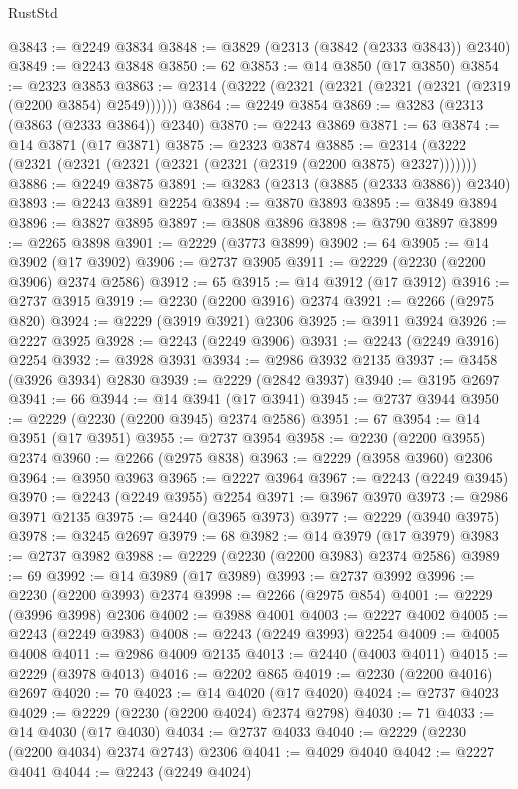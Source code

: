 \begin{lexlean}{RustStd}
\begin{coremodule}
@3843 := @2249 @3834
@3848 := @3829 (@2313 (@3842 (@2333 @3843)) @2340)
@3849 := @2243 @3848
@3850 := 62
@3853 := @14 @3850 (@17 @3850)
@3854 := @2323 @3853
@3863 := @2314 (@3222 (@2321 (@2321 (@2321 (@2321 (@2319 (@2200 @3854) @2549))))))
@3864 := @2249 @3854
@3869 := @3283 (@2313 (@3863 (@2333 @3864)) @2340)
@3870 := @2243 @3869
@3871 := 63
@3874 := @14 @3871 (@17 @3871)
@3875 := @2323 @3874
@3885 := @2314 (@3222 (@2321 (@2321 (@2321 (@2321 (@2321 (@2319 (@2200 @3875) @2327)))))))
@3886 := @2249 @3875
@3891 := @3283 (@2313 (@3885 (@2333 @3886)) @2340)
@3893 := @2243 @3891 @2254
@3894 := @3870 @3893
@3895 := @3849 @3894
@3896 := @3827 @3895
@3897 := @3808 @3896
@3898 := @3790 @3897
@3899 := @2265 @3898
@3901 := @2229 (@3773 @3899)
@3902 := 64
@3905 := @14 @3902 (@17 @3902)
@3906 := @2737 @3905
@3911 := @2229 (@2230 (@2200 @3906) @2374 @2586)
@3912 := 65
@3915 := @14 @3912 (@17 @3912)
@3916 := @2737 @3915
@3919 := @2230 (@2200 @3916) @2374
@3921 := @2266 (@2975 @820)
@3924 := @2229 (@3919 @3921) @2306
@3925 := @3911 @3924
@3926 := @2227 @3925
@3928 := @2243 (@2249 @3906)
@3931 := @2243 (@2249 @3916) @2254
@3932 := @3928 @3931
@3934 := @2986 @3932 @2135
@3937 := @3458 (@3926 @3934) @2830
@3939 := @2229 (@2842 @3937)
@3940 := @3195 @2697
@3941 := 66
@3944 := @14 @3941 (@17 @3941)
@3945 := @2737 @3944
@3950 := @2229 (@2230 (@2200 @3945) @2374 @2586)
@3951 := 67
@3954 := @14 @3951 (@17 @3951)
@3955 := @2737 @3954
@3958 := @2230 (@2200 @3955) @2374
@3960 := @2266 (@2975 @838)
@3963 := @2229 (@3958 @3960) @2306
@3964 := @3950 @3963
@3965 := @2227 @3964
@3967 := @2243 (@2249 @3945)
@3970 := @2243 (@2249 @3955) @2254
@3971 := @3967 @3970
@3973 := @2986 @3971 @2135
@3975 := @2440 (@3965 @3973)
@3977 := @2229 (@3940 @3975)
@3978 := @3245 @2697
@3979 := 68
@3982 := @14 @3979 (@17 @3979)
@3983 := @2737 @3982
@3988 := @2229 (@2230 (@2200 @3983) @2374 @2586)
@3989 := 69
@3992 := @14 @3989 (@17 @3989)
@3993 := @2737 @3992
@3996 := @2230 (@2200 @3993) @2374
@3998 := @2266 (@2975 @854)
@4001 := @2229 (@3996 @3998) @2306
@4002 := @3988 @4001
@4003 := @2227 @4002
@4005 := @2243 (@2249 @3983)
@4008 := @2243 (@2249 @3993) @2254
@4009 := @4005 @4008
@4011 := @2986 @4009 @2135
@4013 := @2440 (@4003 @4011)
@4015 := @2229 (@3978 @4013)
@4016 := @2202 @865
@4019 := @2230 (@2200 @4016) @2697
@4020 := 70
@4023 := @14 @4020 (@17 @4020)
@4024 := @2737 @4023
@4029 := @2229 (@2230 (@2200 @4024) @2374 @2798)
@4030 := 71
@4033 := @14 @4030 (@17 @4030)
@4034 := @2737 @4033
@4040 := @2229 (@2230 (@2200 @4034) @2374 @2743) @2306
@4041 := @4029 @4040
@4042 := @2227 @4041
@4044 := @2243 (@2249 @4024)

\end{coremodule}
\end{lexlean}
